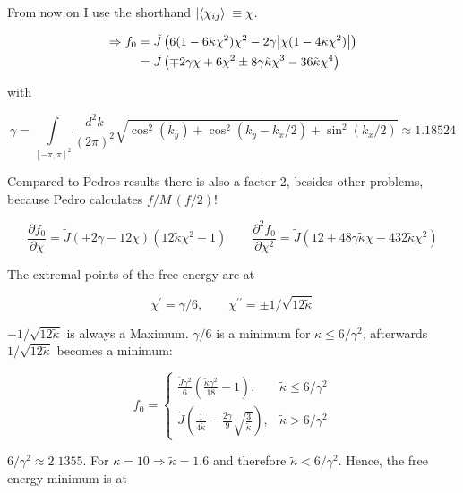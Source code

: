 \documentclass[../../../main.tex]{subfiles}
\begin{document}
From now on I use the shorthand $\abs{\langle \chi_{ij} \rangle} \equiv \chi$.

\begin{align}
	\Rightarrow f_0 &= \tilde{J} \left( 6(1-6\tilde{\kappa}\chi^2)\chi^2 -2\gamma\abs{\chi(1-4\tilde{\kappa}\chi^2)} \right) \notag \\
	&= \tilde{J} \left( \mp2\gamma\chi +6\chi^2 \pm 8 \gamma \tilde{\kappa} \chi^3 - 36\tilde{\kappa}\chi^4\right)
\end{align}

with 

\begin{equation}
	\gamma = \int\limits_{[-\pi, \pi]^2} \frac{d^2k}{(2\pi)^2}\sqrt{\cos^2(k_y) + \cos^2(k_y - k_x/2) + \sin^2(k_x/2)} \approx 1.18524
\end{equation}

Compared to Pedros results there is also a factor 2, besides other problems, because Pedro calculates $f/M \, (f/2)$!


\begin{equation}
	\frac{\partial f_0}{\partial \chi} = \tilde{J}\left(\pm2\gamma - 12\chi\right)\left(12\tilde{\kappa}\chi^2 - 1\right) \qquad \frac{\partial^2 f_0}{\partial \chi^2} = \tilde{J}\left(12 \pm 48\gamma \tilde{\kappa}\chi - 432\tilde{\kappa}\chi^2\right)
\end{equation}

The extremal points of the free energy are at 

\begin{equation}
	\chi^\prime = \gamma/6, \qquad \chi^{\prime\prime} = \pm 1/\sqrt{12\tilde{\kappa}}
\end{equation}

$-1/\sqrt{12\tilde{\kappa}}$ is always a Maximum. $\gamma/6$ is a minimum for $\kappa \leq 6/\gamma^2$, afterwards $1/\sqrt{12\tilde{\kappa}}$ becomes a minimum:

\begin{equation}
f_0 = 
	\begin{cases}
		\frac{\tilde{J} \gamma^2}{6} \left( \frac{\tilde{\kappa} \gamma^2}{18} - 1\right), & \tilde{\kappa} \leq 6/\gamma^2 \\
		\tilde{J} \left(\frac{1}{4\tilde{\kappa}} - \frac{2\gamma}{9} \sqrt{\frac{3}{\tilde{\kappa}}}\right), &\tilde{\kappa} > 6/\gamma^2
	\end{cases}
\end{equation}

$6/\gamma^2 \approx 2.1355$. For $\kappa = 10 \Rightarrow \tilde{\kappa} = 1.\bar{6}$ and therefore $\tilde{\kappa} < 6/\gamma^2$. Hence, the free energy minimum is at
\end{document}
